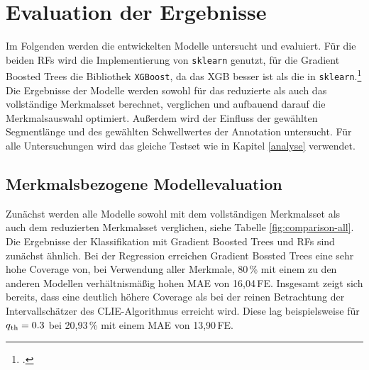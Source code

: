 \chapter{Evaluation der Ergebnisse}\label{evaluation}

Im Folgenden werden die entwickelten Modelle untersucht und evaluiert. Für die beiden \acl{RF}s wird die Implementierung von \texttt{sklearn} genutzt, für die Gradient Boosted Trees die Bibliothek \texttt{XGBoost}, da das \ac{XGB} besser ist als die in \texttt{sklearn}.\footcite[Kapitel 10]{Harrison2019} Die Ergebnisse der Modelle werden sowohl für das reduzierte als auch das vollständige Merkmalsset berechnet, verglichen und aufbauend darauf die Merkmalsauswahl optimiert. Außerdem wird der Einfluss der gewählten Segmentlänge und des gewählten Schwellwertes der Annotation untersucht. Für alle Untersuchungen wird das gleiche Testset wie in Kapitel \ref{analyse} verwendet.

\section{Merkmalsbezogene Modellevaluation} %

Zunächst werden alle Modelle sowohl mit dem vollständigen Merkmalsset als auch dem reduzierten Merkmalsset verglichen, siehe Tabelle \ref{fig:comparison-all}. Die Ergebnisse der Klassifikation mit Gradient Boosted Trees und \acl{RF}s sind zunächst ähnlich. Bei der Regression erreichen Gradient Bossted Trees eine sehr hohe Coverage von, bei Verwendung aller Merkmale, 80\,\% mit einem zu den anderen Modellen verhältnismäßig hohen \ac{MAE} von 16,04\,\si{FE}. Insgesamt zeigt sich bereits, dass eine deutlich höhere Coverage als bei der reinen Betrachtung der Intervallschätzer des CLIE-Algorithmus erreicht wird. Diese lag beispielsweise für $q\textsubscript{th} = 0.3$ bei 20,93\,\% mit einem \ac{MAE} von 13,90\,\si{FE}.

